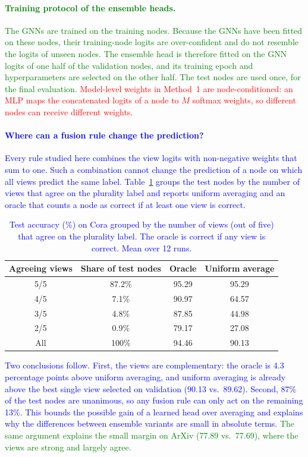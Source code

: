 \documentclass{article}
\newcommand{\revone}[1]{\textcolor{red}{#1}}   %
\newcommand{\revtwo}[1]{\textcolor{blue}{#1}}  %
\newcommand{\revthree}[1]{\textcolor{green}{#1}} %
\begin{document}
\paragraph{\revthree{Training protocol of the ensemble heads.}}
\revthree{The GNNs are trained on the training nodes. Because the GNNs have been fitted on these nodes, their training-node logits are over-confident and do not resemble the logits of unseen nodes. The ensemble head is therefore fitted on the GNN logits of one half of the validation nodes, and its training epoch and hyperparameters are selected on the other half. The test nodes are used once, for the final evaluation.} \revone{Model-level weights in Method~1 are node-conditioned: an MLP maps the concatenated logits of a node to $M$ softmax weights, so different nodes can receive different weights.}

\paragraph{\revtwo{Where can a fusion rule change the prediction?}}
\revtwo{Every rule studied here combines the view logits with non-negative weights that sum to one. Such a combination cannot change the prediction of a node on which all views predict the same label. Table~\ref{tab:ens_agreement} groups the test nodes by the number of views that agree on the plurality label and reports uniform averaging and an oracle that counts a node as correct if at least one view is correct.}

\begin{table}[ht]
\centering
\caption{\revtwo{Test accuracy (\%) on Cora grouped by the number of views (out of five) that agree on the plurality label. The oracle is correct if any view is correct. Mean over 12 runs.}}
\label{tab:ens_agreement}
\begin{tabular}{c c c c}
\hline
Agreeing views & Share of test nodes & Oracle & Uniform average \\
\hline
5/5 & 87.2\% & 95.29 & 95.29 \\
4/5 &  7.1\% & 90.97 & 64.57 \\
3/5 &  4.8\% & 87.85 & 44.98 \\
2/5 &  0.9\% & 79.17 & 27.08 \\
\hline
All & 100\%  & 94.46 & 90.13 \\
\hline
\end{tabular}
\end{table}

\revtwo{Two conclusions follow. First, the views are complementary: the oracle is 4.3 percentage points above uniform averaging, and uniform averaging is already above the best single view selected on validation (90.13 vs.\ 89.62). Second, 87\% of the test nodes are unanimous, so any fusion rule can only act on the remaining 13\%. This bounds the possible gain of a learned head over averaging and explains why the differences between ensemble variants are small in absolute terms.} \revthree{The same argument explains the small margin on ArXiv (77.89 vs.\ 77.69), where the views are strong and largely agree.}
\end{document}
